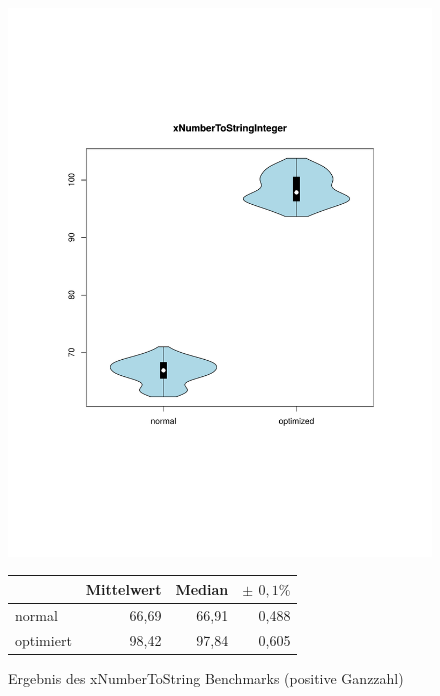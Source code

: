\begin{figure}[H]
{		\includegraphics[trim=20mm 60mm 0mm 50mm,scale=0.50]{pictures/vioplot_xNumberToStringInteger.pdf}
	}

	\begin{table}[H]
	\centering
		\begin{tabular}{|l|r|r|r|}
			\hline
		   		 	  & Mittelwert & Median & \bf{$\pm$ $0,1\%$} \\
		 	\hline
		 	\hline
		  	normal 	  & 66,69 & 66,91 & 0,488 \\
		 	optimiert & 98,42 & 97,84 & 0,605 \\ 
		  	\hline
		  	
		\end{tabular}
	\end{table}

	\caption{Ergebnis des xNumberToString Benchmarks (positive Ganzzahl)}\label{bp:instURIBench}
\end{figure}


